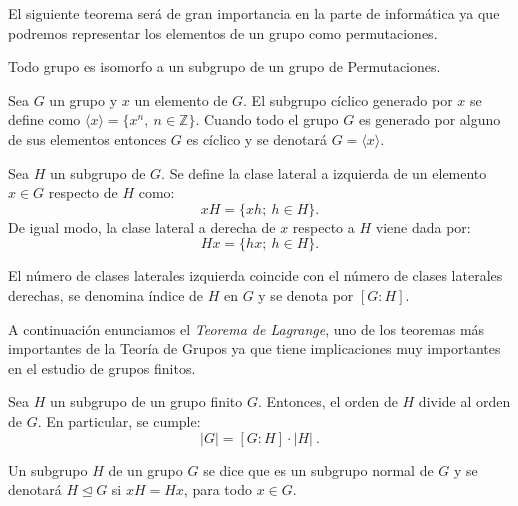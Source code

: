 El siguiente teorema será de gran importancia en la parte de informática ya que podremos representar los elementos de un grupo como permutaciones.
\begin{theorem}[Cayley] \label{cayley}
Todo grupo es isomorfo a un subgrupo de un grupo de Permutaciones.
\end{theorem}



\begin{theorem}
Sea $G$ un grupo y $x$ un elemento de $G$. El subgrupo cíclico generado por $x$ se define como $\langle x \rangle = \{x^n, \: n \in \mathbb{Z}\}$. Cuando todo el grupo $G$ es generado por alguno de sus elementos entonces $G$ es cíclico y se denotará $G= \langle x \rangle$.
\end{theorem}

















\begin{definition} \label{clases}
    Sea $H$ un subgrupo de $G$. Se define la clase lateral a izquierda de un elemento $x \in G$ respecto de $H$ como:
    \[
        xH = \{ xh;\: h \in H \}.
    \]
    De igual modo, la clase lateral a derecha de $x$ respecto a $H$ viene dada por:
    \[
        Hx = \{ hx; \: h \in H\}.
    \]
    
    El número de clases laterales izquierda coincide con el número de clases laterales derechas, se denomina índice de $H$ en $G$ y se denota por $[G:H]$.
    

\end{definition}


\newpage
A continuación enunciamos el \textit{Teorema de Lagrange}, uno de los teoremas más importantes de la Teoría de Grupos ya que tiene implicaciones muy importantes en el estudio de grupos finitos.

\begin{theorem}[Lagrange] \label{Lagrange}
Sea $H$ un subgrupo de un grupo finito $G$. Entonces, el orden de $H$ divide al orden de $G$. En particular, se cumple:
\[
    |G| = [G:H]\cdot|H|\:.
\]
\end{theorem}






\begin{definition}
	Un subgrupo $H$ de un grupo $G$ se dice que es un subgrupo normal de $G$ y se denotará $H \unlhd G$ si $xH=Hx$, para todo $x \in G$. 
\end{definition} 


